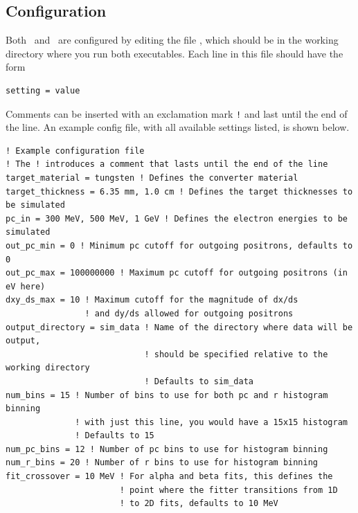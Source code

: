 \documentclass[12pt]{article}
\begin{document}
\subsection{Configuration}
Both \exes \, and \exef \, are configured by editing the file \configfile, which should be in the working directory where you run both executables.
Each line in this file should have the form
\begin{verbatim}
setting = value
\end{verbatim}
Comments can be inserted with an exclamation mark \texttt{!} and last until the end of the line.
An example config file, with all available settings listed, is shown below.
\begin{verbatim}
! Example configuration file
! The ! introduces a comment that lasts until the end of the line
target_material = tungsten ! Defines the converter material
target_thickness = 6.35 mm, 1.0 cm ! Defines the target thicknesses to be simulated
pc_in = 300 MeV, 500 MeV, 1 GeV ! Defines the electron energies to be simulated
out_pc_min = 0 ! Minimum pc cutoff for outgoing positrons, defaults to 0
out_pc_max = 100000000 ! Maximum pc cutoff for outgoing positrons (in eV here)
dxy_ds_max = 10 ! Maximum cutoff for the magnitude of dx/ds
                ! and dy/ds allowed for outgoing positrons
output_directory = sim_data ! Name of the directory where data will be output,
                            ! should be specified relative to the working directory
                            ! Defaults to sim_data
num_bins = 15 ! Number of bins to use for both pc and r histogram binning
              ! with just this line, you would have a 15x15 histogram
              ! Defaults to 15
num_pc_bins = 12 ! Number of pc bins to use for histogram binning
num_r_bins = 20 ! Number of r bins to use for histogram binning
fit_crossover = 10 MeV ! For alpha and beta fits, this defines the
                       ! point where the fitter transitions from 1D
                       ! to 2D fits, defaults to 10 MeV
\end{verbatim}
\newcommand{\targetm}{\texttt{target\_material}}
\newcommand{\targett}{\texttt{target\_thickness}}
\newcommand{\pcin}{\texttt{pc\_in}}
\newcommand{\outpcmin}{\texttt{out\_pc\_min}}
\newcommand{\outpcmax}{\texttt{out\_pc\_max}}
\newcommand{\dxydsmax}{\texttt{dxy\_ds\_max}}
\newcommand{\outdir}{\texttt{output\_directory}}
\newcommand{\numbins}{\texttt{num\_bins}}
\newcommand{\numrbins}{\texttt{num\_r\_bins}}
\newcommand{\numpcbins}{\texttt{num\_pc\_bins}}
\newcommand{\fitxpt}{\texttt{fit\_crossover}}
\end{document}
